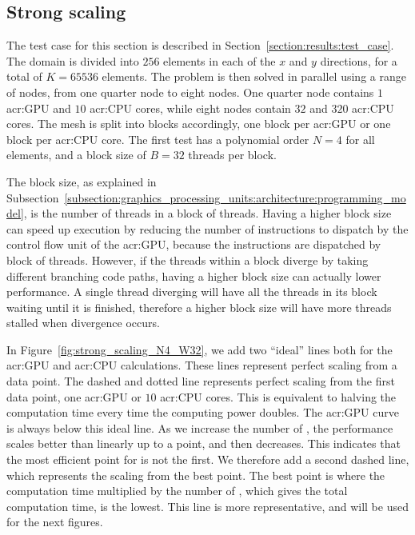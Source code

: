 \subsection{Strong scaling}\label{subsection:results:scaling_tests:strong}

The test case for this section is described in Section~\ref{section:results:test_case}. The domain
is divided into \(256\) elements in each of the \(x\) and \(y\) directions, for a total of \(K =
65536\) elements. The problem is then solved in parallel using a range of nodes, from one quarter
node to eight nodes. One quarter node contains \(1\) \acrshort{acr:GPU} and \(10\)
\acrshort{acr:CPU} cores, while eight nodes contain \(32\)  and \(320\)
\acrshort{acr:CPU} cores. The mesh is split into blocks accordingly, one block per
\acrshort{acr:GPU} or one block per \acrshort{acr:CPU} core. The first test has a polynomial order
\(N = 4\) for all elements, and a block size of \(B = 32\) threads per block.

The block size, as explained in
Subsection~\ref{subsection:graphics_processing_units:architecture:programming_model}, is the number
of threads in a block of threads. Having a higher block size can speed up execution by reducing the
number of instructions to dispatch by the control flow unit of the \acrshort{acr:GPU}, because the
instructions are dispatched by block of threads. However, if the threads within a block diverge by
taking different branching code paths, having a higher block size can actually lower performance. A
single thread diverging will have all the threads in its block waiting until it is finished,
therefore a higher block size will have more threads stalled when divergence occurs.

In Figure~\ref{fig:strong_scaling_N4_W32}, we add two ``ideal'' lines both for the
\acrshort{acr:GPU} and \acrshort{acr:CPU} calculations. These lines represent perfect scaling from a
data point. The dashed and dotted line represents perfect scaling from the first data point, one
\acrshort{acr:GPU} or \(10\) \acrshort{acr:CPU} cores. This is equivalent to halving the computation
time every time the computing power doubles. The \acrshort{acr:GPU} curve is always below this ideal
line. As we increase the number of , the performance scales better than linearly
up to a point, and then decreases. This indicates that the most efficient point for
 is not the first. We therefore add a second dashed line, which represents the
scaling from the best point. The best point is where the computation time multiplied by the number
of , which gives the total computation time, is the lowest. This line is more
representative, and will be used for the next figures.

